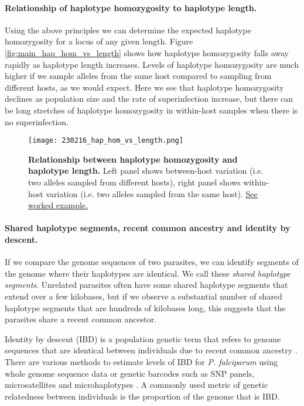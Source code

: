 \documentclass[_main.tex]{subfiles}
\begin{document}

\paragraph{Relationship of haplotype homozygosity to haplotype length.}  Using the above principles we can determine the expected haplotype homozygosity for a locus of any given length.   Figure \ref{fig:main_hap_hom_vs_length} shows how haplotype homozygosity falls away rapidly as haplotype length increases.  Levels of haplotype homozygosity are much higher if we sample alleles from the same host compared to sampling from different hosts, as we would expect.  Here we see that haplotype homozygosity declines as population size and the rate of superinfection increase, but there can be long stretches of haplotype homozygosity in within-host samples when there is no superinfection. 

\begin{figure}[h!]
\centering
\texttt{[image: 230216\_hap\_hom\_vs\_length.png]}
\caption{\textbf{Relationship between haplotype homozygosity and haplotype length.} Left panel shows between-host variation (i.e. two alleles sampled from different hosts), right panel shows within-host variation (i.e. two alleles sampled from the same host).  \href{https://d-kwiat.github.io/gtg/haplotype-homozygosity.html}{See worked example.}
} 
\end{figure}


\paragraph{Shared haplotype segments, recent common ancestry and identity by descent.}  \label{main_shs_ancestry}

If we compare the genome sequences of two parasites, we can identify segments of the genome where their haplotypes are identical.  We call these \textit{shared haplotype segments}.  Unrelated parasites often have some shared haplotype segments that extend over a few kilobases, but if we observe a substantial number of shared haplotype segments that are hundreds of kilobases long, this suggests that the parasites share a recent common ancestor. 

Identity by descent (IBD) is a population genetic term that refers to genome sequences that are identical between individuals due to recent common ancestry \cite{Browning2012}.  There are various methods to estimate levels of IBD for \textit{P. falciparum} using whole genome sequence data \cite{Schaffner2018,Henden2018} or genetic barcodes such as SNP panels, microsatellites and microhaplotypes \cite{Taylor2017,Taylor2019,Taylor2020,Gerlovina2022}.  A commonly used metric of genetic relatedness between individuals is the proportion of the genome that is IBD. 
\end{document}

